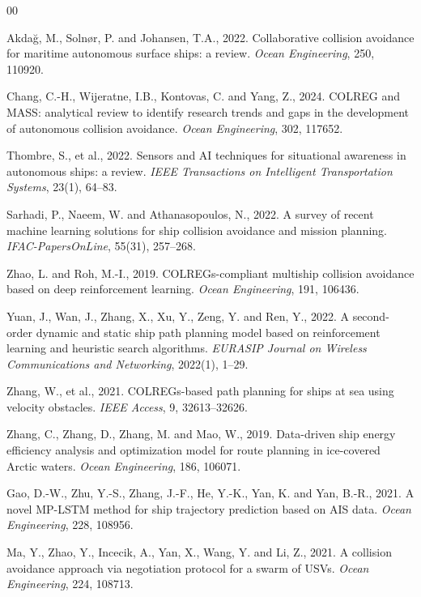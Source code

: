 \documentclass[final,5p,times,twocolumn]{elsarticle}
\begin{document}
\begin{thebibliography}{00}

Akdağ, M., Solnør, P. and Johansen, T.A., 2022. Collaborative collision avoidance for maritime autonomous surface ships: a review. \textit{Ocean Engineering}, 250, 110920.

Chang, C.-H., Wijeratne, I.B., Kontovas, C. and Yang, Z., 2024. COLREG and MASS: analytical review to identify research trends and gaps in the development of autonomous collision avoidance. \textit{Ocean Engineering}, 302, 117652.

Thombre, S., et al., 2022. Sensors and AI techniques for situational awareness in autonomous ships: a review. \textit{IEEE Transactions on Intelligent Transportation Systems}, 23(1), 64--83.

Sarhadi, P., Naeem, W. and Athanasopoulos, N., 2022. A survey of recent machine learning solutions for ship collision avoidance and mission planning. \textit{IFAC-PapersOnLine}, 55(31), 257--268.

Zhao, L. and Roh, M.-I., 2019. COLREGs-compliant multiship collision avoidance based on deep reinforcement learning. \textit{Ocean Engineering}, 191, 106436.

Yuan, J., Wan, J., Zhang, X., Xu, Y., Zeng, Y. and Ren, Y., 2022. A second-order dynamic and static ship path planning model based on reinforcement learning and heuristic search algorithms. \textit{EURASIP Journal on Wireless Communications and Networking}, 2022(1), 1--29.

Zhang, W., et al., 2021. COLREGs-based path planning for ships at sea using velocity obstacles. \textit{IEEE Access}, 9, 32613--32626.

Zhang, C., Zhang, D., Zhang, M. and Mao, W., 2019. Data-driven ship energy efficiency analysis and optimization model for route planning in ice-covered Arctic waters. \textit{Ocean Engineering}, 186, 106071.

Gao, D.-W., Zhu, Y.-S., Zhang, J.-F., He, Y.-K., Yan, K. and Yan, B.-R., 2021. A novel MP-LSTM method for ship trajectory prediction based on AIS data. \textit{Ocean Engineering}, 228, 108956.

Ma, Y., Zhao, Y., Incecik, A., Yan, X., Wang, Y. and Li, Z., 2021. A collision avoidance approach via negotiation protocol for a swarm of USVs. \textit{Ocean Engineering}, 224, 108713.


\end{thebibliography}
\end{document}
